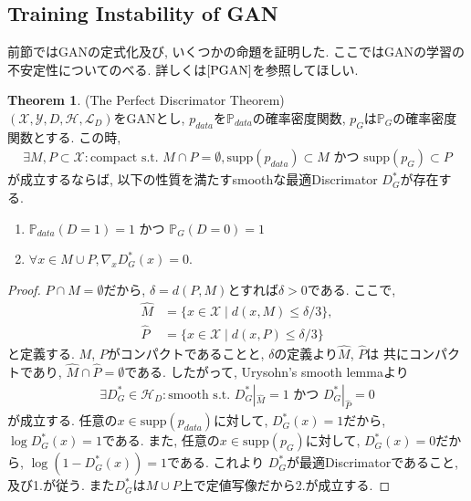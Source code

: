 \documentclass[11pt, a4paper, dvipdfmx]{jsarticle}
\theoremstyle{definition}
\newtheorem{Theorem+}[Axiom+]{Theorem}
\newcommand{\X}{\mathcal{X}}
\newcommand{\Y}{\mathcal{Y}}
\newcommand{\Hil}{\mathcal{H}}
\newcommand{\Loss}{\mathcal{L}_{D}}
\newcommand{\MLsp}{(\X, \Y, D, \Hil, \Loss)}
\begin{document}
\subsection{Training Instability of GAN}
前節ではGANの定式化及び, いくつかの命題を証明した. ここではGANの学習の不安定性についてのべる. 詳しくは$\cite{PGAN}$を参照してほしい.
\begin{Theorem+}(The Perfect Discrimator Theorem)\\
    $\MLsp$をGANとし, $p_{data}$を$\mathbb{P}_{data}$の確率密度関数, $p_{G}$は$\mathbb{P}_{G}$の確率密度関数とする. この時, 
    \begin{align*}
        \exists M, P\subset\X:\text{compact s.t. }M\cap P = \emptyset, \text{supp}(p_{data})\subset M\text{ かつ }\text{supp}(p_{G})\subset P
    \end{align*}
    が成立するならば, 以下の性質を満たすsmoothな最適Discrimator $D_{G}^{*}$が存在する. 
    \begin{enumerate}
        \item $\mathbb{P}_{data}(D = 1) = 1\text{ かつ }\mathbb{P}_{G}(D = 0) = 1$
        \item $\forall x\in M\cup P, \nabla_{x}D_{G}^{*}(x) = 0$.
    \end{enumerate}
    \begin{proof}
        $P\cap M = \emptyset$だから, $\delta = d(P, M)$とすれば$\delta > 0$である. 
        ここで, 
        \begin{align*}
            \hat{M} &= \{x\in\X\mid d(x, M) \leq\delta/3\},\\
            \hat{P} &= \{x\in\X\mid d(x, P)\leq\delta/3\}
        \end{align*}
        と定義する. $M$, $P$がコンパクトであることと, $\delta$の定義より$\hat{M}$, $\hat{P}$は
        共にコンパクトであり, $\hat{M}\cap\hat{P}=\emptyset$である. したがって, Urysohn's smooth lemmaより
        \begin{align*}
            \exists D_{G}^{*}\in\Hil_{D}:\text{smooth s.t. } D_{G}^{*}|_{\hat{M}} = 1\text{ かつ }D_{G}^{*}|_{\hat{P}} = 0
        \end{align*}
        が成立する. 任意の$x\in\text{supp}(p_{data})$に対して, $D_{G}^{*}(x) = 1$だから, $\log D_{G}^{*}(x) = 1$である. 
        また, 任意の$x\in\text{supp}(p_{G})$に対して, $D_{G}^{*}(x) = 0$だから, $\log (1 - D_{G}^{*}(x)) = 1$である. これより
        $D_{G}^{*}$が最適Discrimatorであること, 及び1.が従う. また$D_{G}^{*}$は$M\cup P$上で定値写像だから2.が成立する. 
    \end{proof}
\end{Theorem+}
\end{document}
